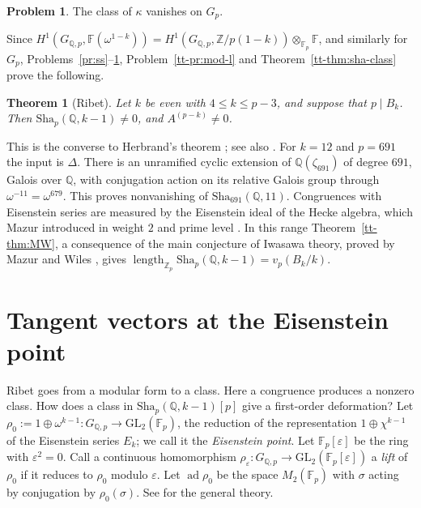 \documentclass[reqno]{amsart}
\theoremstyle{definition}
\newtheorem{problem}{Problem}[section]
\theoremstyle{plain}
\newtheorem{theorem}{Theorem}[section]
\newcommand{\Z}{\mathbb{Z}}
\newcommand{\Q}{\mathbb{Q}}
\newcommand{\F}{\mathbb{F}}
\newcommand{\Zp}{\Z_p}
\newcommand{\ad}{\operatorname{ad}}
\newcommand{\Sha}{\mathrm{Sha}}
\newcommand{\GQ}{G_{\Q,p}}
\begin{document}
\begin{problem}\label{pr:unram}
The class of \(\kappa\) vanishes on \(G_p\).
\end{problem}

Since \(H^1(\GQ, \F(\omega^{1-k})) = H^1(\GQ, \Z/p(1-k)) \otimes_{\F_p} \F\), and similarly for \(G_p\), Problems~\ref{pr:ss}--\ref{pr:unram}, Problem~\ref{tt-pr:mod-l} and Theorem~\ref{tt-thm:sha-class} prove the following.

\begin{theorem}[Ribet]\label{thm:ribet}
Let \(k\) be even with \(4 \le k \le p-3\), and suppose that \(p \mid B_k\).  Then \(\Sha_p(\Q, k-1) \ne 0\), and \(A^{(p-k)} \ne 0\).
\end{theorem}

This is the converse to Herbrand's theorem \cite{Ri}; see also \cite[Thm.~6.18]{Wa}.  For \(k = 12\) and \(p = 691\) the input is \(\Delta\).  There is an unramified cyclic extension of \(\Q(\zeta_{691})\) of degree \(691\), Galois over \(\Q\), with conjugation action on its relative Galois group through \(\omega^{-11} = \omega^{679}\).  This proves nonvanishing of \(\Sha_{691}(\Q,11)\).  Congruences with Eisenstein series are measured by the Eisenstein ideal of the Hecke algebra, which Mazur introduced in weight \(2\) and prime level \cite{Ma}.  In this range Theorem~\ref{tt-thm:MW}, a consequence of the main conjecture of Iwasawa theory, proved by Mazur and Wiles \cite{MW}, gives \(\operatorname{length}_{\Zp}\Sha_p(\Q,k-1)=v_p(B_k/k)\).

\section{Tangent vectors at the Eisenstein point}\label{sec:tangent}

Ribet goes from a modular form to a class.  Here a congruence produces a nonzero class.  How does a class in \(\Sha_p(\Q,k-1)[p]\) give a first-order deformation?  Let \(\rho_0 := 1 \oplus \omega^{k-1} \colon \GQ \to \mathrm{GL}_2(\F_p)\), the reduction of the representation \(1 \oplus \chi^{k-1}\) of the Eisenstein series \(E_k\); we call it the \emph{Eisenstein point}.  Let \(\F_p[\varepsilon]\) be the ring with \(\varepsilon^2 = 0\).  Call a continuous homomorphism \(\rho_\varepsilon \colon \GQ \to \mathrm{GL}_2(\F_p[\varepsilon])\) a \emph{lift} of \(\rho_0\) if it reduces to \(\rho_0\) modulo \(\varepsilon\).  Let \(\ad \rho_0\) be the space \(M_2(\F_p)\) with \(\sigma\) acting by conjugation by \(\rho_0(\sigma)\).  See \cite[\S1]{Mz} for the general theory.
\end{document}
